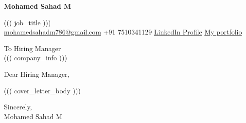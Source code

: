 \documentclass[12pt]{article}
\begin{document}

\begin{center}
    {\Huge\textbf{Mohamed Sahad M}} \\
\end{center}

\begingroup
\makeatletter{}\makeatother
{}
\label{sec:jobtitle}
\begin{center}
    {\large ((( job_title ))) } \\
    \vspace{0.3cm}
    \href{mailto:mohamedsahadm786@gmail.com}{mohamedsahadm786@gmail.com} \quad
    +91 7510341129 \quad
    \href{https://www.linkedin.com/in/mohamed-sahad-m-96b038200/}{LinkedIn Profile} \quad
    \href{https://mohamedsahadm786.github.io/My_Portfoli/}{My portfolio} \\
\end{center}
\endgroup

\vspace{0.5cm}

\begingroup
\makeatletter{}\makeatother
{}
\label{sec:address}
To Hiring Manager \\
((( company_info ))) \\
\endgroup

\vspace{1cm}

Dear Hiring Manager, \\

\begingroup
\makeatletter\def\@currentlabel{narration}\makeatother
{}
\label{sec:narration}

((( cover_letter_body )))

\endgroup

\vspace{0.8cm}

Sincerely, \\
Mohamed Sahad M
\end{document}
